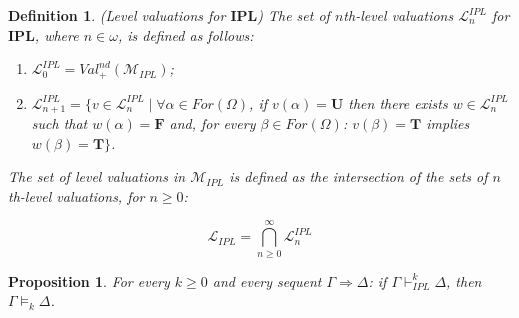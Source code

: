 \documentclass[10pt,a4paper]{amsart}
\newtheorem{definition}{Definition}
\newtheorem{proposition}{Proposition}
\newcommand{\bF}{\mathbf{F}}
\newcommand{\bT}{\mathbf{T}}
\newcommand{\bU}{\mathbf{U}}
\newcommand{\ipl}{\ensuremath{\mathbf{IPL}}}
\begin{document}
\begin{definition}\label{def:level_valuations_IPL} (Level valuations for \ipl)
The set of $n$th-level valuations $\mathcal{L}^{IPL}_n$ for \ipl, where $n \in \omega$, is defined as follows: 

    \begin{enumerate}[label=\roman*)]
        \item $\mathcal{L}_0^{IPL} = Val^{nd}_+(\mathcal{M}_{IPL})$;
        \item $\mathcal{L}^{IPL}_{n + 1} = \{ v \in \mathcal{L}^{IPL}_n \mid \forall \alpha \in For(\Omega)$, if $v(\alpha)=\bU$ then there exists $w \in \mathcal{L}^{IPL}_n$ such that $w(\alpha)=\bF$ and,  for every $\beta \in  For(\Omega)$: $v(\beta)=\bT$ implies $w(\beta)=\bT\}$.
    \end{enumerate}
    The set of level valuations in $\mathcal{M}_{IPL}$ is defined as the intersection of the sets of $n$th-level valuations, for $n\geq0$:

    \[
        \mathcal{L}_{IPL} = \bigcap^\infty_{n \geq 0} \mathcal{L}^{IPL}_n
    \]

\end{definition}

\begin{proposition} \label{seq-rules-sound}
For every $k \geq 0$ and every sequent $\Gamma \Rightarrow\Delta$: if $\Gamma \vdash_{IPL}^k \Delta$, then $\Gamma\models_k\Delta$.
\end{proposition}
\end{document}

